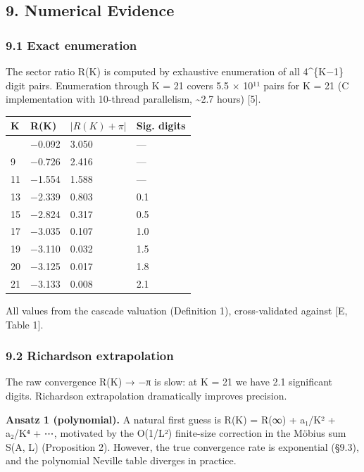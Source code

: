 \documentclass[
  11pt,
]{article}
\begin{document}
\newpage

\subsection{9. Numerical Evidence}\label{numerical-evidence}

\subsubsection{9.1 Exact enumeration}\label{exact-enumeration}

The sector ratio R(K) is computed by exhaustive enumeration of all 4\^{}\{K−1\}
digit pairs. Enumeration through K = 21 covers 5.5 × 10¹¹ pairs for K = 21 (C
implementation with 10-thread parallelism, \textasciitilde2.7 hours) {[}5{]}.

\begin{longtable}[]{@{}llll@{}}
\toprule\noalign{}
K & R(K) & \(\lvert R(K) + \pi \rvert\) & Sig. digits \\
\midrule\noalign{}
\endhead
\bottomrule\noalign{}
\endlastfoot
7 & −0.092 & 3.050 & --- \\
9 & −0.726 & 2.416 & --- \\
11 & −1.554 & 1.588 & --- \\
13 & −2.339 & 0.803 & 0.1 \\
15 & −2.824 & 0.317 & 0.5 \\
17 & −3.035 & 0.107 & 1.0 \\
19 & −3.110 & 0.032 & 1.5 \\
20 & −3.125 & 0.017 & 1.8 \\
21 & −3.133 & 0.008 & 2.1 \\
\end{longtable}

All values from the cascade valuation (Definition 1), cross-validated against
{[}E, Table 1{]}.

\subsubsection{9.2 Richardson extrapolation}\label{richardson-extrapolation}

The raw convergence R(K) → −π is slow: at K = 21 we have 2.1 significant digits.
Richardson extrapolation dramatically improves precision.

\textbf{Ansatz 1 (polynomial).} A natural first guess is R(K) = R(∞) + a₁/K² +
a₂/K⁴ + ⋯, motivated by the O(1/L²) finite-size correction in the Möbius sum
S(A, L) (Proposition 2). However, the true convergence rate is exponential
(§9.3), and the polynomial Neville table diverges in practice.
\end{document}
